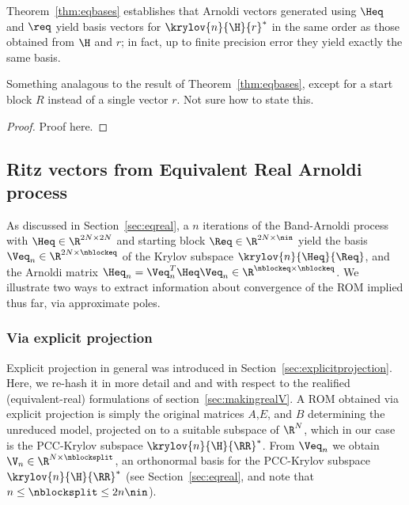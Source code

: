 Theorem~\ref{thm:eqbases} establishes that Arnoldi vectors generated using $\Heq$ and $\req$
yield basis vectors for $\krylov{n}{\H}{r}^*$ in the same order as those obtained from $\H$ and $r$;
in fact, up to finite precision error they yield exactly the same basis.

\begin{corollary}
Something analagous to the result of Theorem~\ref{thm:eqbases}, except for a start block $R$ instead
of a single vector $r$.  Not sure how to state this.
\end{corollary}

\begin{proof}
Proof here.
\end{proof}


\subsection{Ritz vectors from Equivalent Real Arnoldi process}
As discussed in Section~\ref{sec:eqreal}, a $n$ iterations of the Band-Arnoldi process with
$\Heq\in\R^{2N \times 2N}$ and starting block $\Req\in\R^{2N \times \nin}$ yield
the basis $\Veq_n\in\R^{2N \times \nblockeq}$ of the Krylov subspace $\krylov{n}{\Heq}{\Req}$,
and the Arnoldi matrix $\Heq_n=\Veq_n^T \Heq \Veq_n\in\R^{\nblockeq \times \nblockeq}$.
We illustrate two ways to extract information about convergence of the ROM implied thus far,
via  approximate poles.

\subsubsection{Via explicit projection}
Explicit projection in general was introduced in Section~\ref{sec:explicitprojection}.
Here, we re-hash it in more detail and and with respect
to the realified (equivalent-real) formulations of section~\ref{sec:makingrealV}.
A ROM obtained via explicit projection is simply the original matrices $A$,$E$, and $B$
determining the unreduced model, projected on to a suitable subspace of $\R^N$,
which in our case is the PCC-Krylov subspace $\krylov{n}{\H}{\RR}^*$.
From $\Veq_n$ we obtain $\V_n\in\R^{N \times \nblocksplit}$, an orthonormal basis for the PCC-Krylov
subspace $\krylov{n}{\H}{\RR}^*$ (see Section~\ref{sec:eqreal}, and note
that $n\leq\nblocksplit\leq 2n\nin$).


